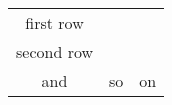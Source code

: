 \begin{acknowledgements}
	\begin{tabular}{ccc}
		first row & & \\
		second row & & \\
		and & so & on \\
	\end{tabular}		
\end{acknowledgements}      
